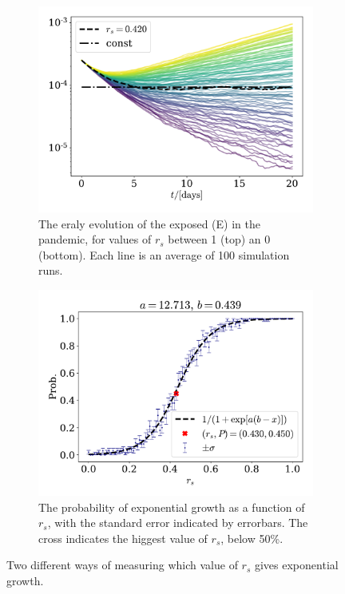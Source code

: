 \documentclass{article}
\begin{document}
    \begin{figure}[H]
        \centering
        \begin{subfigure}{.49\textwidth}
            \includegraphics[width=\textwidth]{../plots/2C/isolation.pdf}
            \caption{The eraly evolution of the exposed (E) in the pandemic, for values of $r_s$ between 1 (top) an 0 (bottom). Each line is an average of 100 simulation runs.}
            \label{isolation1}
        \end{subfigure}
        \begin{subfigure}{.49\textwidth}
            \includegraphics[width=\textwidth]{../plots/2C/isolation2_prob.pdf}
            \caption{The probability of exponential growth as a function of $r_s$, with the standard error indicated by errorbars. The cross indicates the higgest value of $r_s$, below 50\%.}
            \label{isolation2}
        \end{subfigure}
        \caption{Two different ways of measuring which value of $r_s$ gives exponential growth.}
        \label{isolation}
    \end{figure}
\end{document}
